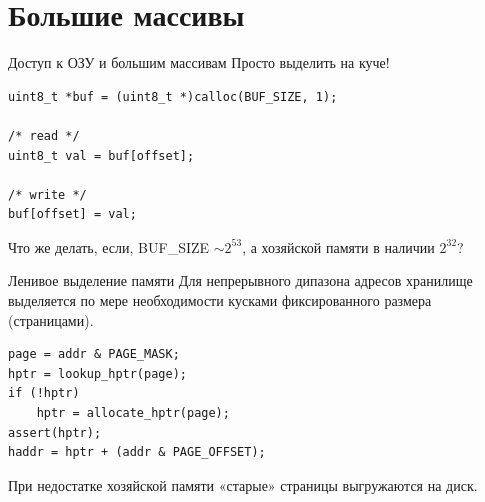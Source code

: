 \documentclass{beamer}
\begin{document}
\section{Большие массивы}

\begin{frame}[fragile]{Доступ к ОЗУ и большим массивам}
Просто выделить на куче!
\begin{verbatim}
uint8_t *buf = (uint8_t *)calloc(BUF_SIZE, 1);

/* read */
uint8_t val = buf[offset];

/* write */
buf[offset] = val;
\end{verbatim}
\pause
Что же делать, если, BUF_SIZE $\sim 2^{53}$, а хозяйской памяти в наличии $2^{32}$?
\end{frame}

\begin{frame}[fragile]{Ленивое выделение памяти}
Для непрерывного дипазона адресов хранилище выделяется по мере необходимости кусками фиксированного размера (страницами).

\begin{verbatim}
page = addr & PAGE_MASK;
hptr = lookup_hptr(page);
if (!hptr)
    hptr = allocate_hptr(page);
assert(hptr);
haddr = hptr + (addr & PAGE_OFFSET);
\end{verbatim}
При недостатке хозяйской памяти «старые» страницы выгружаются на диск.
\end{frame}
\end{document}

